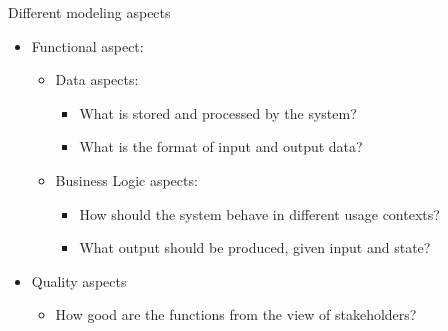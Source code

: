 
\begin{Slide}{Different modeling aspects }


\begin{itemize}
\item Functional aspect:
\begin{itemize}
\item Data aspects:
\begin{itemize}
\item What is stored and processed by the system?
\item What is the format of input and output data?

\end{itemize}
\item Business Logic aspects: 
\begin{itemize}
\item How should the system behave in different usage contexts?
\item What output should be produced, given input and state?  

\end{itemize}
\end{itemize}
\item Quality aspects
\begin{itemize}
\item How good are the functions from the view of stakeholders?

\end{itemize}
\end{itemize}
\end{Slide}